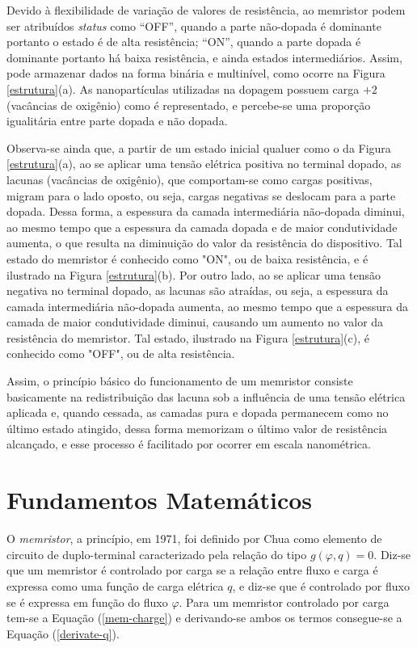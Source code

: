 \documentclass{ceel}
\begin{document}
\begin{multicols}{2}
Devido à flexibilidade de variação de valores de resistência, ao memristor podem ser atribuídos \emph{status} como “OFF”, quando a parte não-dopada é dominante portanto o estado é de alta resistência; “ON”, quando a parte dopada é dominante portanto há baixa resistência, e ainda estados intermediários. Assim, pode armazenar dados na forma binária e multinível, como ocorre na Figura \ref{estrutura}(a). As nanopartículas utilizadas na dopagem possuem carga $+2$ (vacâncias de oxigênio) como é representado, e percebe-se uma proporção igualitária entre parte dopada e não dopada. 

Observa-se ainda que, a partir de um estado inicial qualuer como o da Figura \ref{estrutura}(a), ao se aplicar uma tensão elétrica positiva 
no terminal dopado, as lacunas (vacâncias de oxigênio), que comportam-se como cargas positivas, migram para o lado oposto, ou seja, cargas negativas se deslocam para a parte dopada.
 Dessa forma, a espessura da camada intermediária não-dopada diminui, ao mesmo tempo que a espessura da camada dopada e de maior condutividade aumenta, o que resulta na diminuição do valor da resistência do dispositivo. Tal estado do memristor é conhecido como "ON", ou de baixa resistência, e é ilustrado na Figura \ref{estrutura}(b). 
%
Por outro lado, ao se aplicar uma tensão negativa no terminal dopado, as lacunas são atraídas, ou seja, a espessura da camada intermediária não-dopada aumenta, ao mesmo tempo que a espessura 
da camada de maior condutividade diminui, causando um aumento no valor da resistência do memristor. Tal estado, ilustrado na Figura \ref{estrutura}(c), é conhecido como "OFF", ou de alta resistência. 

Assim, o princípio básico do funcionamento de um memristor consiste basicamente na redistribuição das lacuna sob a influência de uma tensão elétrica aplicada e, quando cessada, as 
camadas pura e dopada permanecem como no último estado atingido, dessa forma memorizam o último valor de resistência alcançado, e esse processo é facilitado por ocorrer em 
escala nanométrica. %

\section{Fundamentos Matemáticos}\label{analise-matematica}
O \emph{memristor}, a princípio, em 1971, foi definido por Chua \cite{artigo} como elemento de circuito de duplo-terminal caracterizado pela relação do tipo $g(\varphi, q)=0$. Diz-se que 
um memristor é controlado por carga se a relação entre fluxo e carga é expressa como uma função de carga elétrica $q$, e diz-se que é controlado por fluxo se é expressa em função do 
fluxo $\varphi$. Para um memristor controlado por carga tem-se a Equação (\ref{mem-charge}) e derivando-se ambos os termos consegue-se a Equação (\ref{derivate-q}).


\end{multicols}
\end{document}
